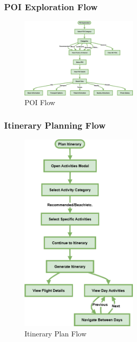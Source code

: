 \documentclass[]{project_final}
\begin{document}
\newpage
\subsubsection{POI Exploration Flow}

\begin{figure}[ht!]
  \centering
  \includegraphics[width=0.5\textwidth]{TPPOIFlow.png}
  \vspace*{0.0cm}
  \caption{POI Flow}
  \label{fig:1}
\end{figure}
\newpage
\subsubsection{Itinerary Planning Flow}

\begin{figure}[ht!]
  \centering
  \includegraphics[width=0.5\textwidth]{TPItineraryPlanFlow.png}
  \vspace*{0.0cm}
  \caption{Itinerary Plan Flow}
  \label{fig:1}
\end{figure}
\newpage
\end{document}
